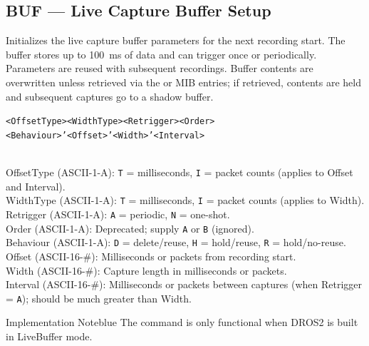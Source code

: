 \subsection{BUF --- Live Capture Buffer Setup}
\label{cmd:buf}
\begin{description}[style=nextline]
    \item[Description:]
        Initializes the live capture buffer parameters for the next recording
        start.  The buffer stores up to 100~ms of data and can trigger once
        or periodically.  Parameters are reused with subsequent recordings.
        Buffer contents are overwritten unless retrieved via the
         or  MIB entries; if retrieved,
        contents are held and subsequent captures go to a shadow buffer.
    \item[Argument Format:]
        \texttt{<OffsetType><WidthType><Retrigger><Order><Behaviour>'<Offset>'<Width>'<Interval>}
    \item[Arguments:]~\\
        OffsetType (ASCII-1-A): \texttt{T} = milliseconds, \texttt{I} = packet
            counts (applies to Offset and Interval). \\
        WidthType (ASCII-1-A): \texttt{T} = milliseconds, \texttt{I} = packet
            counts (applies to Width). \\
        Retrigger (ASCII-1-A): \texttt{A} = periodic, \texttt{N} = one-shot. \\
        Order (ASCII-1-A): Deprecated; supply \texttt{A} or \texttt{B}
            (ignored). \\
        Behaviour (ASCII-1-A): \texttt{D} = delete/reuse, \texttt{H} =
            hold/reuse, \texttt{R} = hold/no-reuse. \\
        Offset (ASCII-16-\#): Milliseconds or packets from recording start. \\
        Width (ASCII-16-\#): Capture length in milliseconds or packets. \\
        Interval (ASCII-16-\#): Milliseconds or packets between captures
            (when Retrigger = \texttt{A}); should be much greater than Width.
\end{description}


\begin{calloutBox}{Implementation Note}{blue}
The  command is only functional when DROS2 is built in LiveBuffer mode.
\end{calloutBox}

